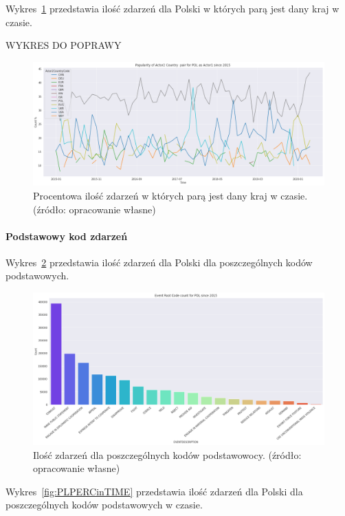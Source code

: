 \documentclass[11pt]{report}
\begin{document}
    Wykres~\ref{fig:PLpairPerc} przedstawia ilość zdarzeń dla Polski w których parą jest dany kraj w czasie.

    WYKRES DO POPRAWY
    \begin{figure}[ht!]
        \centering
        \includegraphics[width=1 \textwidth]{fig/PL/PLactor2PairPercinTIME.png}
        \caption{Procentowa ilość zdarzeń w których parą jest dany kraj w czasie. (źródło: opracowanie własne)}
        \label{fig:PLpairPerc}
    \end{figure}

    \paragraph{Podstawowy kod zdarzeń}

    Wykres~\ref{fig:PLPERC} przedstawia ilość zdarzeń dla Polski dla poszczególnych kodów podstawowych.


    \begin{figure}[ht!]
        \centering
        \includegraphics[width=1 \textwidth]{fig/PL/PLERC.png}
        \caption{Ilość zdarzeń dla poszczególnych kodów podstawowocy. (źródło: opracowanie własne)}
        \label{fig:PLPERC}
    \end{figure}

    Wykres~\ref{fig:PLPERCinTIME} przedstawia ilość zdarzeń dla Polski dla poszczególnych kodów podstawowych w czasie.
\end{document}
